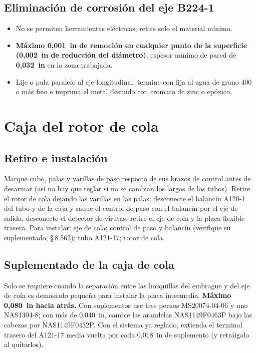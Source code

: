 \subsection{Eliminación de corrosión del eje B224-1}

\begin{itemize}
\item No se permiten herramientas eléctricas; retire solo el material mínimo.
\item \textbf{Máximo 0,001~in de remoción en cualquier punto de la superficie (0,002~in de reducción del diámetro)}; espesor mínimo de pared de \textbf{0,032~in} en la zona trabajada.
\item Lije o pula paralelo al eje longitudinal; termine con lija al agua de grano 400 o más fino e imprima el metal desnudo con cromato de zinc o epóxico.
\end{itemize}

\section{Caja del rotor de cola}

\subsection{Retiro e instalación}

Marque cubo, palas y varillas de paso respecto de sus brazos de control antes de desarmar (así no hay que reglar si no se cambian los largos de los tubos). Retire el rotor de cola dejando las varillas en las palas; desconecte el balancín A120-1 del tubo y de la caja y saque el control de paso con el balancín por el eje de salida; desconecte el detector de virutas; retire el eje de cola y la placa flexible trasera. Para instalar: eje de cola; control de paso y balancín (verifique su suplementado, \S\,8.562); tubo A121-17; rotor de cola.

\subsection{Suplementado de la caja de cola}

Solo se requiere cuando la separación entre las horquillas del embrague y del eje de cola es demasiado pequeña para instalar la placa intermedia. \textbf{Máximo 0,080~in hacia atrás.} Con suplementos use tres pernos MS20074-04-06 y uno NAS1304-8; con más de 0,040~in, cambie las arandelas NAS1149F0463P bajo las cabezas por NAS1149F0432P. Con el sistema ya reglado, extienda el terminal trasero del A121-17 media vuelta por cada 0,018~in de suplemento (y retráigalo al quitarlos).

